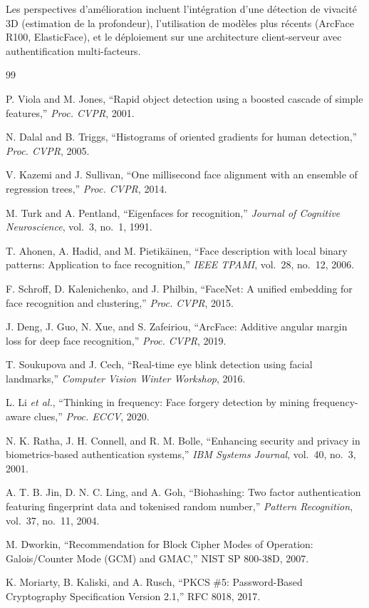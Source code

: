 \documentclass[12pt,a4paper]{article}
\begin{document}
Les perspectives d'amélioration incluent l'intégration d'une détection de
vivacité 3D (estimation de la profondeur), l'utilisation de modèles plus
récents (ArcFace R100, ElasticFace), et le déploiement sur une architecture
client-serveur avec authentification multi-facteurs.

\newpage
\begin{thebibliography}{99}

P. Viola and M. Jones, ``Rapid object detection using a boosted cascade of
simple features,'' \textit{Proc. CVPR}, 2001.

N. Dalal and B. Triggs, ``Histograms of oriented gradients for human
detection,'' \textit{Proc. CVPR}, 2005.

V. Kazemi and J. Sullivan, ``One millisecond face alignment with an ensemble
of regression trees,'' \textit{Proc. CVPR}, 2014.

M. Turk and A. Pentland, ``Eigenfaces for recognition,''
\textit{Journal of Cognitive Neuroscience}, vol.~3, no.~1, 1991.

T. Ahonen, A. Hadid, and M. Pietikäinen, ``Face description with local binary
patterns: Application to face recognition,'' \textit{IEEE TPAMI},
vol.~28, no.~12, 2006.

F. Schroff, D. Kalenichenko, and J. Philbin, ``FaceNet: A unified embedding
for face recognition and clustering,'' \textit{Proc. CVPR}, 2015.

J. Deng, J. Guo, N. Xue, and S. Zafeiriou, ``ArcFace: Additive angular
margin loss for deep face recognition,'' \textit{Proc. CVPR}, 2019.

T. Soukupova and J. Cech, ``Real-time eye blink detection using facial
landmarks,'' \textit{Computer Vision Winter Workshop}, 2016.

L. Li \textit{et al.}, ``Thinking in frequency: Face forgery detection by
mining frequency-aware clues,'' \textit{Proc. ECCV}, 2020.

N. K. Ratha, J. H. Connell, and R. M. Bolle, ``Enhancing security and privacy
in biometrics-based authentication systems,'' \textit{IBM Systems Journal},
vol.~40, no.~3, 2001.

A. T. B. Jin, D. N. C. Ling, and A. Goh, ``Biohashing: Two factor
authentication featuring fingerprint data and tokenised random number,''
\textit{Pattern Recognition}, vol.~37, no.~11, 2004.

M. Dworkin, ``Recommendation for Block Cipher Modes of Operation:
Galois/Counter Mode (GCM) and GMAC,'' NIST SP 800-38D, 2007.

K. Moriarty, B. Kaliski, and A. Rusch, ``PKCS \#5: Password-Based
Cryptography Specification Version 2.1,'' RFC 8018, 2017.

\end{thebibliography}
\end{document}
